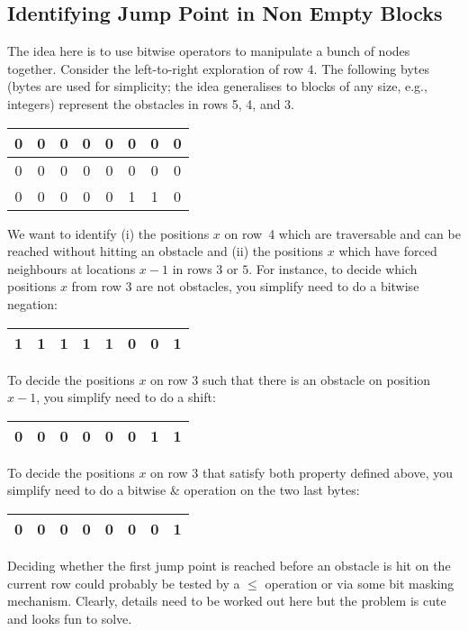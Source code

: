 \newpage
\subsection{Identifying Jump Point in Non Empty Blocks}
The idea here is to use bitwise operators
to manipulate a bunch of nodes together.  
Consider the left-to-right exploration of row $4$.  
The following bytes (bytes are used for simplicity; 
the idea generalises to blocks of any size, e.g., integers) 
represent the obstacles in rows 5, 4, and 3.  

\begin{center}
  \begin{tabular}{|c|c|c|c|c|c|c|c|}
    \hline
    0 & 0 & 0 & 0 & 0 & 0 & 0 & 0 \\
    \hline
    0 & 0 & 0 & 0 & 0 & 0 & 0 & 0 \\
    \hline
    0 & 0 & 0 & 0 & 0 & 1 & 1 & 0 \\
    \hline
  \end{tabular}
\end{center}

We want to identify (i) the positions $x$ on row~4 which are traversable and can
be reached without hitting an obstacle and (ii) the positions $x$ which have
forced neighbours at locations $x-1$ in rows $3$ or $5$.
For instance, to decide which positions $x$ from row 3 
are not obstacles, you simplify need to do a bitwise negation: 
\begin{center}
  \begin{tabular}{|c|c|c|c|c|c|c|c|}
    \hline
    1 & 1 & 1 & 1 & 1 & 0 & 0 & 1 \\
    \hline
  \end{tabular}
\end{center}
To decide the positions $x$ on row 3 
such that there is an obstacle on position $x-1$, 
you simplify need to do a shift: 
\begin{center}
  \begin{tabular}{|c|c|c|c|c|c|c|c|}
    \hline
    0 & 0 & 0 & 0 & 0 & 0 & 1 & 1 \\
    \hline
  \end{tabular}
\end{center}
To decide the positions $x$ on row 3 
that satisfy both property defined above, 
you simplify need to do a bitwise \& operation 
on the two last bytes: 
\begin{center}
  \begin{tabular}{|c|c|c|c|c|c|c|c|}
    \hline
    0 & 0 & 0 & 0 & 0 & 0 & 0 & 1 \\
    \hline
  \end{tabular}
\end{center}

Deciding whether the first jump point is  reached
before an obstacle is hit on the current row 
could probably be tested by a $\le$ operation or via
some bit masking mechanism.
\newpage
Clearly, details need to be worked out here but the problem
is cute and looks fun to solve.
